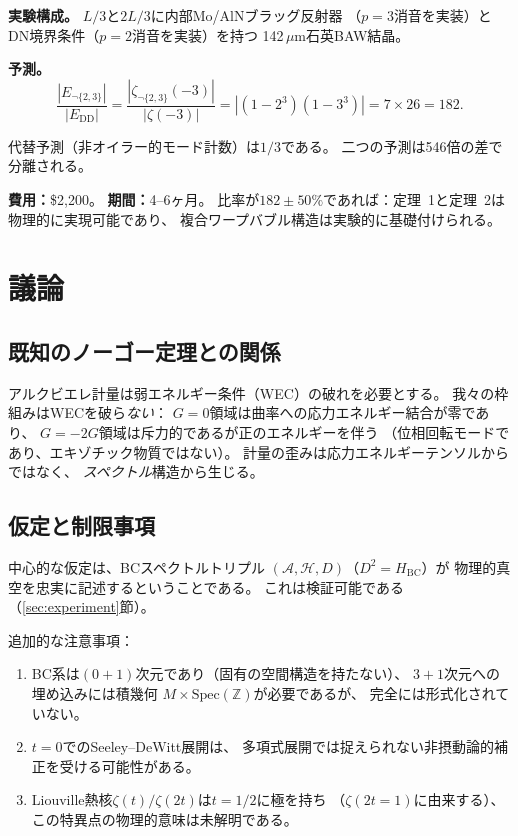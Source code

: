 \documentclass[a4paper,11pt]{article}
\newcommand{\Spec}{\mathrm{Spec}}
\begin{document}
\textbf{実験構成。}
$L/3$と$2L/3$に内部Mo/AlNブラッグ反射器
（$p = 3$消音を実装）とDN境界条件（$p = 2$消音を実装）を持つ
142\,$\mu$m石英BAW結晶。

\textbf{予測。}
\begin{equation}
  \frac{|E_{\neg\{2,3\}}|}{|E_{\mathrm{DD}}|}
  = \frac{|\zeta_{\neg\{2,3\}}(-3)|}{|\zeta(-3)|}
  = |(1 - 2^3)(1 - 3^3)| = 7 \times 26 = 182.
\end{equation}

代替予測（非オイラー的モード計数）は$1/3$である。
二つの予測は546倍の差で分離される。

\textbf{費用：}\$2{,}200。
\textbf{期間：}4--6ヶ月。
比率が$182 \pm 50\%$であれば：定理~1と定理~2は物理的に実現可能であり、
複合ワープバブル構造は実験的に基礎付けられる。

\section{議論}

\subsection{既知のノーゴー定理との関係}

アルクビエレ計量は弱エネルギー条件（WEC）の破れを必要とする。
我々の枠組みはWECを破ら\emph{ない}：
$G = 0$領域は曲率への応力エネルギー結合が零であり、
$G = -2G$領域は斥力的であるが正のエネルギーを伴う
（位相回転モードであり、エキゾチック物質ではない）。
計量の歪みは応力エネルギーテンソルからではなく、
\emph{スペクトル}構造から生じる。

\subsection{仮定と制限事項}

中心的な仮定は、BCスペクトルトリプル
$(\mathcal{A}, \mathcal{H}, D)$（$D^2 = H_{\mathrm{BC}}$）が
物理的真空を忠実に記述するということである。
これは検証可能である（\ref{sec:experiment}節）。

追加的な注意事項：
\begin{enumerate}
\item BC系は$(0+1)$次元であり（固有の空間構造を持たない）、
  $3+1$次元への埋め込みには積幾何
  $M \times \Spec(\mathbb{Z})$が必要であるが、
  完全には形式化されていない。
\item $t = 0$でのSeeley--DeWitt展開は、
  多項式展開では捉えられない非摂動論的補正を受ける可能性がある。
\item Liouville熱核$\zeta(t)/\zeta(2t)$は$t = 1/2$に極を持ち
  （$\zeta(2t = 1)$に由来する）、
  この特異点の物理的意味は未解明である。
\end{enumerate}
\end{document}
